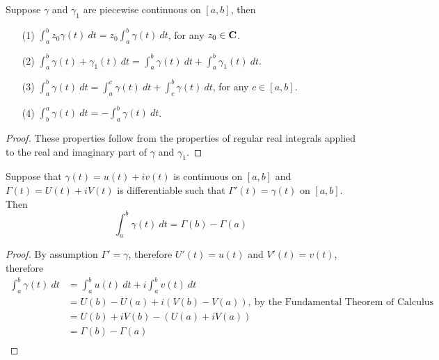 \vspace*{1em}

\begin{proposition}\label{paraint}
Suppose $\gamma$ and $\gamma_1$ are piecewise continuous on $[a,b]$, then
\begin{itemize}[itemsep=0.5em]
\item[(1)] $\displaystyle \int_a^bz_0 \gamma(t)\ dt = z_0\int_a^b\gamma(t)\ dt$, for any $z_0 \in \mathbf C$.
\item[(2)] $\displaystyle \int_a^b \gamma(t) + \gamma_1(t)\ dt = \int_a^b\gamma(t)\ dt + \int_a^b\gamma_1(t)\ dt$.
\item[(3)] $\displaystyle \int_a^b \gamma(t)\ dt = \int_a^c\gamma(t)\ dt + \int_c^b\gamma(t)\ dt$, for any $c \in [a,b]$.
\item[(4)] $\displaystyle \int_b^a \gamma(t)\ dt = -\int_a^b\gamma(t)\ dt$.
\end{itemize}
\end{proposition}
\begin{proof}
These properties follow from the properties of regular real integrals applied to the real and imaginary part of $\gamma$ and $\gamma_1$.
\end{proof}

\vspace*{1em}

\begin{proposition}\label{pathftc}
Suppose that $\gamma(t) = u(t) + iv(t)$ is continuous on $[a,b]$ and $\Gamma(t) = U(t) + iV(t)$ is differentiable such that $\Gamma'(t) = \gamma(t)$ on $[a,b]$. Then
\[\int_a^b\gamma(t)\ dt = \Gamma(b) - \Gamma(a)\]
\end{proposition}
\begin{proof}
By assumption $\Gamma' = \gamma$, therefore $U'(t) = u(t)$ and $V'(t) = v(t)$, therefore
\begin{align*}
\int_a^b\gamma(t)\ dt &= \int_a^bu(t)\ dt + i\int_a^bv(t)\ dt\\[0.5em]
&= U(b) - U(a) + i(V(b) - V(a)),\ \text{by the Fundamental Theorem of Calculus}\\[0.5em]
&= U(b) + iV(b) - (U(a) + iV(a))\\[0.5em]
&= \Gamma(b) - \Gamma(a)\\[-2.5em]
\end{align*}
\end{proof}

\vspace*{1em}

